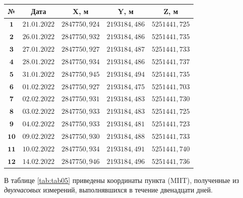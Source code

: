\begin{table} [h!]
	\centering\small
	\label{tab:tab04}{%
		\begin{tabular}{|c|c|c|c|c|}
			\hline
			\textbf{№} & \textbf{Дата} & \textbf{X, м} & \textbf{Y, м} & \textbf{Z, м} \\
			\hline
			\textbf{ $\mathbf{1}$} & $21.01.2022$ & $2847750,924$ & $2193184,486$ & $5251441,725$ \\
			\hline
			\textbf{ $\mathbf{2}$} & $26.01.2022$ & $2847750,932$ & $2193184,486$ & $5251441,735$ \\
			\hline
			\textbf{ $\mathbf{3}$} & $27.01.2022$ & $2847750,927$ & $2193184,487$ & $5251441,733$ \\
			\hline
			\textbf{ $\mathbf{4}$} & $28.01.2022$ & $2847750,934$ & $2193184,486$ & $5251441,737$ \\
			\hline
			\textbf{ $\mathbf{5}$} & $31.01.2022$ & $2847750,945$ & $2193184,494$ & $5251441,735$ \\
			\hline
			\textbf{ $\mathbf{6}$} & $01.02.2022$ & $2847750,927$ & $2193184,475$ & $5251441,703$ \\
			\hline
			\textbf{ $\mathbf{7}$} & $02.02.2022$ & $2847750,931$ & $2193184,483$ & $5251441,730$ \\
			\hline
			\textbf{ $\mathbf{8}$} & $03.02.2022$ & $2847750,933$ & $2193184,483$ & $5251441,725$ \\
			\hline
			\textbf{ $\mathbf{9}$} & $04.02.2022$ & $2847750,933$ & $2193184,481$ & $5251441,723$ \\
			\hline
			\textbf{$\mathbf{10}$} & $09.02.2022$ & $2847750,930$ & $2193184,488$ & $5251441,733$ \\
			\hline
			\textbf{$\mathbf{11}$} & $10.02.2022$ & $2847750,934$ & $2193184,491$ & $5251441,740$ \\
			\hline
			\textbf{$\mathbf{12}$} & $14.02.2022$ & $2847750,946$ & $2193184,496$ & $5251441,736$ \\
			\hline
		\end{tabular}
	}
\end{table}

В таблице \cref{tab:tab05} приведены координаты пункта (MIIT), полученные из \textit{двухчасовых} измерений, выполнявшихся в течение двенадцати дней.

